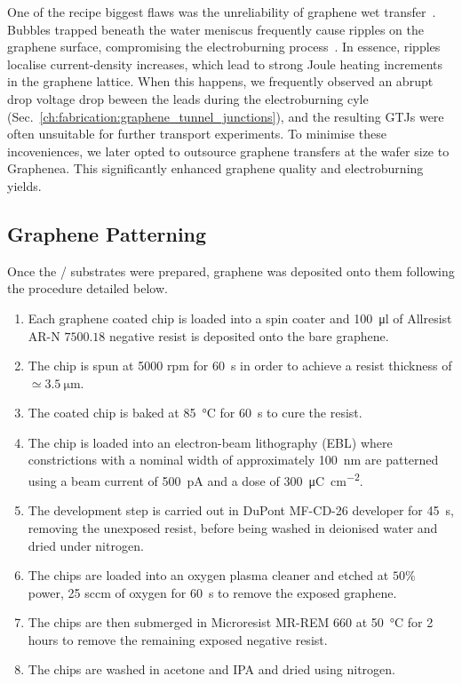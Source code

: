 One of the recipe biggest flaws was the unreliability of graphene wet transfer~\cite{chen2016progress}. Bubbles trapped beneath the water meniscus frequently cause ripples on the graphene surface, compromising the electroburning process~\cite{ullah2021graphene}. In essence, ripples localise current-density increases, which lead to strong Joule heating increments in the graphene lattice. When this happens, we frequently observed an abrupt drop voltage drop beween the leads during the electroburning cyle (Sec.~\ref{ch:fabrication:graphene_tunnel_junctions}), and the resulting \glspl{GTJ} were often unsuitable for further transport experiments. To minimise these incoveniences, we later opted to outsource graphene transfers at the wafer size to Graphenea. This significantly enhanced graphene quality and electroburning yields.

\subsection{Graphene Patterning}

Once the / substrates were prepared, graphene was deposited onto them following the procedure detailed below.

\begin{enumerate}

    \item Each graphene coated chip is loaded into a spin coater and \SI{100}{\micro\litre} of Allresist AR-N $7500.18$ negative resist is deposited onto the bare graphene.
    \item The chip is spun at 5000 rpm for \SI{60}{\second} in order to achieve a resist thickness of $\simeq\SI{3.5}{\micro\metre}$.
    \item The coated chip is baked at \SI{85}{\degreeCelsius} for \SI{60}{\second} to cure the resist.
    \item The chip is loaded into an electron-beam lithography (EBL) where constrictions with a nominal width of approximately \SI{100}{\nano\metre} are patterned using a beam current of \SI{500}{\pico\ampere} and a dose of \SI{300}{\micro\coulomb\per\centi\metre\squared}.
    \item The development step is carried out in DuPont MF-CD-26 developer for \SI{45}{\second}, removing the unexposed resist, before being washed in deionised water and dried under nitrogen.
    \item The chips are loaded into an oxygen plasma cleaner and etched at $50 \%$ power, 25 sccm of oxygen for \SI{60}{\second} to remove the exposed graphene.
    \item The chips are then submerged in Microresist MR-REM 660 at \SI{50}{\degreeCelsius} for 2 hours to remove the remaining exposed negative resist.
    \item The chips are washed in acetone and IPA and dried using nitrogen.

\end{enumerate}

